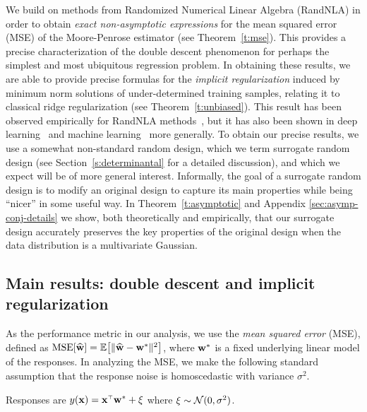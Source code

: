 \documentclass[11pt]{article}
\begin{document}
We build on methods from Randomized Numerical Linear Algebra (RandNLA) in order
to obtain \emph{exact non-asymptotic expressions} for the mean squared error
(MSE) of the Moore-Penrose estimator (see Theorem~\ref{t:mse}).  This provides
a precise characterization of the double descent phenomenon for perhaps the
simplest and most ubiquitous regression problem.  In obtaining these results,
we are able to provide precise formulas for the \emph{implicit regularization}
induced by minimum norm solutions of under-determined training samples,
relating it to classical ridge regularization (see Theorem~\ref{t:unbiased}).
This result has been observed empirically for RandNLA
methods~\citep{Mah-mat-rev_JRNL}, but it has also been shown in deep
learning~\citep{Ney17_TR} and machine learning~\citep{Mah12} more generally.  To
obtain our precise results, we use a somewhat non-standard random design, which
we term surrogate random design (see Section~\ref{s:determinantal} for a
detailed discussion), and which we expect will be of more general interest.
Informally, the goal of a surrogate random design is to modify an original
design to capture its main properties while being ``nicer'' in some useful way.
In Theorem~\ref{t:asymptotic} and Appendix \ref{sec:asymp-conj-details} we show, both
theoretically and empirically, that our surrogate design accurately preserves
the key properties of the original design when the data distribution is a
multivariate Gaussian.

\subsection{Main results: double descent and implicit regularization}

As the performance metric in our analysis, we use the \emph{mean
  squared error} (MSE), defined as
$\mathrm{MSE}[\widehat{\mathbf w}]=\mathbb E\big[\|\widehat{\mathbf w}-\mathbf w^*\|^2\big]$, where $\mathbf w^*$ is a fixed
underlying linear model of the responses.
In analyzing the MSE, we make the following standard assumption that
the response noise is homoscedastic with variance $\sigma^2$.
\begin{assumption}\label{a:linear}
  Responses are $y(\x) = \x^\top\w^*+\xi$ where
$\xi\sim\mathcal{N}(0,\sigma^2)$.
\end{assumption}
\end{document}
